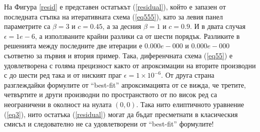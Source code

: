 \documentclass{article}
\newcommand{\rf}[1]{(\ref{#1})}
\begin{document}
На Фигура \ref{resid} е представен остатъкът \rf{residual}, който е запазен от последната стъпка на итеративната схема \rf{eq555}, като за левия панел  параметрите са $\beta = 3$ и $c = 0.45$, а за десния $\beta = 1$ и $c = 0.9$. И в двата случая $\epsilon =1e-6$, а използваните крайни разлики са от шести порядък. Разликите в решенията между последните две итерации е $0.000e-000$ и $0.000e-000$ съответно за първия и втория пример. Така, диференчната схема \rf{eq55} е удовлетворена с голяма прецизност както от апроксимации на вторите производни с до шести ред така и от ниският праг $\epsilon =1\times10^{-6}$. От друга страна разглеждайки формулите от ``best-fit'' апроксимацията от \cite{Ch2011} се вижда, че третите, четвъртите и други производни по пространството от по висок ред са неограничени в околност на нулата $(0,0)$. Така нито елиптичното уравнение \rf{eq3}, нито остатъка \rf{residual} могат да бъдат пресметнати в класическия смисъл и следователно не са удовлетворени от ``best-fit'' формулите!
\end{document}
